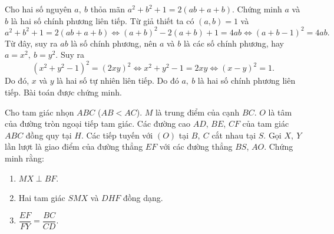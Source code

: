 \begin{ex}%
Cho hai số nguyên $a,\ b$ thỏa mãn $a^2+b^2+1=2(ab+a+b)$.
Chứng minh $a$ và $b$ là hai số chính phương liên tiếp.
\loigiai
    {
Từ giả thiết ta có $(a,b)=1$ và $$a^2+b^2+1=2(ab+a+b) \Leftrightarrow (a+b)^2-2(a+b)+1=4ab \Leftrightarrow (a+b-1)^2=4ab.$$
Từ đây, suy ra $ab$ là số chính phương, nên $a$ và $b$ là các số chính phương, hay $a=x^2,\ b=y^2$. Suy ra
$$(x^2+y^2-1)^2=(2xy)^2 \Leftrightarrow x^2+y^2-1=2xy \Leftrightarrow (x-y)^2=1.$$
Do đó, $x$ và $y$ là hai số tự nhiên liên tiếp. Do đó $a,\ b$ là hai số chính phương liên tiếp. Bài toán được chứng minh.
    }
\end{ex}

\begin{ex}%
  Cho tam giác nhọn $ABC $ ($AB<AC$). $M$ là trung điểm của cạnh $BC$. $O$ là tâm của đường tròn ngoại tiếp tam giác. Các đường cao $AD$, $BE$, $CF$ của tam giác $ABC$ đồng quy tại $H$. Các tiếp tuyến với $(O)$ tại $B,\ C$ cắt nhau tại $S$. Gọi $X,\ Y$ lần lượt là giao điểm của đường thẳng $EF$ với các đường thẳng $BS$, $AO$. Chứng minh rằng:
  \begin{enumerate}
  \item $MX\perp BF$.
\item Hai tam giác $SMX$ và $DHF$ đồng dạng.
\item $\dfrac{EF}{FY}=\dfrac{BC}{CD}$.
  \end{enumerate}
  
\loigiai
    {
    \begin{center}
\end{center}}
\end{ex}
